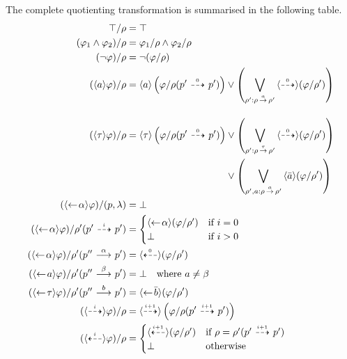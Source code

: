 The complete quotienting transformation is summarised in the following table.
    \begin{align*}
    \true / \rho &= \true \\
    (\phi_1 \land \phi_2)/\rho &= \phi_1/\rho  \land \phi_2 / \rho \\
    (\neg\phi)/\rho &= \neg(\phi/\rho) \\
    (\dmnd{a}\phi) / \rho &= \dmnd{a} \left(\phi / \rho(p'\ptrans{0} p')\right)
        \lor \left(\bigvee_{\rho' : \rho\transshort{a}\rho'} \pdmnd{0} (\phi/\rho') \right)
    \\[1em]
    (\dmnd{\tau}\phi) / \rho &= \dmnd{\tau} \left(\phi / \rho(p'\ptrans{0} p')\right)
        \lor \left(\bigvee_{\rho' : \rho\transshort{\tau}\rho'} \pdmnd{0} (\phi/\rho') \right) \\
        &\phantom{= \dmnd{\tau} \left(\phi / \rho(p'\ptrans{0} p')\right)\;}
        \lor \left( \bigvee_{\rho',a : \rho \transshort{a} \rho'} \dmnd{\bar{a}} (\phi/\rho')  \right) \\
    (\dmndback{\alpha}\phi) / (p,\lambda) &= \false \\
    (\dmndback{\alpha}\phi) / \rho'(p'\ptrans{i} p') &=
    \begin{cases}
        \dmndback{\alpha} (\phi / \rho') & \textrm{if $i=0$} \\
        \false & \textrm{if $i>0$} \\
    \end{cases} \\
    (\dmndback{\alpha}\phi) / \rho'(p''\trans{\alpha} p') &= \pdmndback{0} (\phi / \rho') \\
    (\dmndback{a}\phi) / \rho'(p'' \trans{\beta} p') &= \false \quad\textrm{where $a\ne \beta$} \\
    (\dmndback{\tau}\phi) / \rho'(p'' \trans{b} p') &= \dmndback{\bar{b}} (\phi/\rho') \\
    (\pdmnd{i}\phi) / \rho &= \pdmnd{i+1} \left( \phi / \rho(p'\ptrans{i+1} p') \right) \\
    (\pdmndback{i}\phi) / \rho &= \begin{cases}
        \pdmndback{i+1} (\phi / \rho') & \textrm{if $\rho = \rho'(p' \ptrans{i+1} p')$} \\
        \false & \textrm{otherwise}
    \end{cases} \\
\end{align*}


